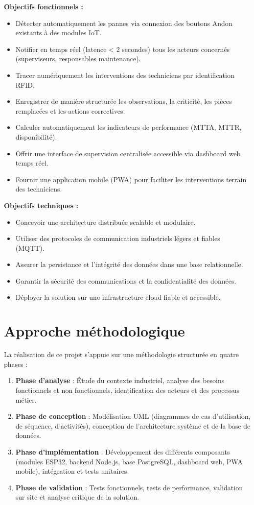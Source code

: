 \textbf{Objectifs fonctionnels :}
\begin{itemize}
    \item Détecter automatiquement les pannes via connexion des boutons Andon existants à des modules IoT.
    \item Notifier en temps réel (latence < 2 secondes) tous les acteurs concernés (superviseurs, responsables maintenance).
    \item Tracer numériquement les interventions des techniciens par identification RFID.
    \item Enregistrer de manière structurée les observations, la criticité, les pièces remplacées et les actions correctives.
    \item Calculer automatiquement les indicateurs de performance (MTTA, MTTR, disponibilité).
    \item Offrir une interface de supervision centralisée accessible via dashboard web temps réel.
    \item Fournir une application mobile (PWA) pour faciliter les interventions terrain des techniciens.
\end{itemize}

\textbf{Objectifs techniques :}
\begin{itemize}
    \item Concevoir une architecture distribuée scalable et modulaire.
    \item Utiliser des protocoles de communication industriels légers et fiables (MQTT).
    \item Assurer la persistance et l'intégrité des données dans une base relationnelle.
    \item Garantir la sécurité des communications et la confidentialité des données.
    \item Déployer la solution sur une infrastructure cloud fiable et accessible.
\end{itemize}

\section*{Approche méthodologique}

La réalisation de ce projet s'appuie sur une méthodologie structurée en quatre phases :

\begin{enumerate}
    \item \textbf{Phase d'analyse} : Étude du contexte industriel, analyse des besoins fonctionnels et non fonctionnels, identification des acteurs et des processus métier.
    \item \textbf{Phase de conception} : Modélisation UML (diagrammes de cas d'utilisation, de séquence, d'activités), conception de l'architecture système et de la base de données.
    \item \textbf{Phase d'implémentation} : Développement des différents composants (modules ESP32, backend Node.js, base PostgreSQL, dashboard web, PWA mobile), intégration et tests unitaires.
    \item \textbf{Phase de validation} : Tests fonctionnels, tests de performance, validation sur site et analyse critique de la solution.
\end{enumerate}

